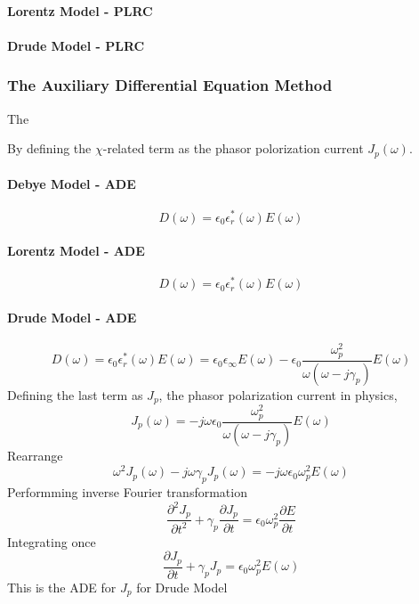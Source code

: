 \paragraph{{\msjh Lorentz Model - PLRC}}

\paragraph{{\msjh Drude Model - PLRC}}

\subsubsection{The Auxiliary Differential Equation Method}
The 

By defining the $\chi$-related term as the phasor polorization current $J_p(\omega)$.
\paragraph{{\msjh Debye Model - ADE}}
\begin{equation}
  D(\omega) = \epsilon_0\epsilon_r^*(\omega)E(\omega)
\end{equation}
\paragraph{{\msjh Lorentz Model - ADE}}
\begin{equation}
  D(\omega) = \epsilon_0\epsilon_r^*(\omega)E(\omega)
\end{equation}
\paragraph{{\msjh Drude Model - ADE}}
\begin{equation}
  D(\omega) = \epsilon_0\epsilon_r^*(\omega)E(\omega) = \epsilon_0 \epsilon_{\infty} E(\omega) - \epsilon_0\frac{\omega_p^2}{\omega(\omega-j\gamma_p)}E(\omega)
\end{equation}
Defining the last term as $J_p$, the phasor polarization current in physics,
\begin{equation}
  J_p(\omega) = -j\omega\epsilon_0\frac{\omega_p^2}{\omega(\omega-j\gamma_p)}E(\omega)
\end{equation}
Rearrange
\begin{equation}
  \omega^2J_p(\omega) - j\omega\gamma_pJ_p(\omega) = -j\omega\epsilon_0\omega_p^2 E(\omega)
\end{equation}
Performming inverse Fourier transformation
\begin{equation}
  \frac{\partial^2 J_p}{\partial t^2} + \gamma_p \frac{\partial J_p}{\partial t} = \epsilon_0\omega_p^2\frac{\partial E}{\partial t}
\end{equation}
Integrating once
\begin{equation}
  \frac{\partial J_p}{\partial t} + \gamma_p J_p = \epsilon_0 \omega_p^2 E(\omega)
\end{equation}
This is the ADE for $J_p$ for Drude Model

